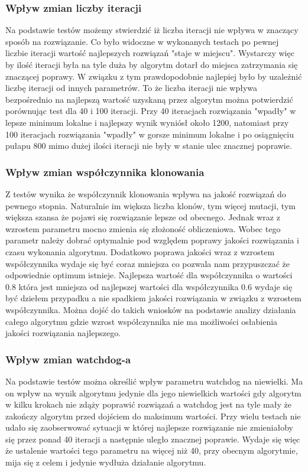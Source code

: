 \documentclass[a4paper]{article}
\begin{document}
\subsubsection{Wpływ zmian liczby iteracji}
Na podstawie testów możemy stwierdzić iż liczba iteracji nie wpływa w znaczący sposób na rozwiązanie. Co było widoczne w wykonanych testach po pewnej liczbie iteracji wartość najlepszych rozwiązań "staje w miejscu". Wystarczy więc by ilość iteracji była na tyle duża by algorytm dotarł do miejsca zatrzymania się znaczącej poprawy. W związku z tym prawdopodobnie najlepiej było by uzależnić liczbę iteracji od innych parametrów. To że liczba iteracji nie wpływa bezpośrednio na najlepszą wartość uzyskaną przez algorytm można potwierdzić porównując test dla 40 i 100 iteracji. Przy 40 iteracjach rozwiązania "wpadły" w lepsze minimum lokalne i najlepszy wynik wyniósł około 1200, natomiast przy 100 iteracjach rozwiązania "wpadły" w gorsze minimum lokalne i po osiągnięciu pułapu 800 mimo dużej ilości iteracji nie były w stanie ulec znacznej poprawie.
\subsubsection{Wpływ zmian współczynnika klonowania}
Z testów wynika że współczynnik klonowania wpływa na jakość rozwiązań do pewnego stopnia. Naturalnie im większa liczba klonów, tym więcej mutacji, tym większa szansa że pojawi się rozwiązanie lepsze od obecnego. Jednak wraz z wzrostem parametru mocno zmienia się złożoność obliczeniowa. Wobec tego parametr należy dobrać optymalnie pod względem poprawy jakości rozwiązania i czasu wykonania algorytmu. Dodatkowo poprawa jakości wraz z wzrostem współczynnika wydaje się być coraz mniejsza co pozwala nam przypuszczać że odpowiednie optimum istnieje. Najlepsza wartość dla współczynnika o wartości 0.8 która jest mniejsza od najlepszej wartości dla współczynnika 0.6 wydaje się być dziełem przypadku a nie spadkiem jakości rozwiązania w związku z wzrostem współczynnika. Można dojść do takich wniosków na podstawie analizy działania całego algorytmu gdzie wzrost współczynnika nie ma możliwości osłabienia jakości rozwiązania najlepszego.
\subsubsection{Wpływ zmian watchdog-a}
Na podstawie testów można określić wpływ parametru watchdog na niewielki. Ma on wpływ na wynik algorytmu jedynie dla jego niewielkich wartości gdy algorytm w kilku krokach nie zdąży poprawić rozwiązań a watchdog jest na tyle mały że zakończy algorytm przed dojściem do maksimum wartości. Przy wielu testach nie udało się zaobserwować sytuacji w której najlepsze rozwiązanie nie zmieniałoby się przez ponad 40 iteracji a następnie uległo znacznej poprawie. Wydaje się więc że ustalenie wartości tego parametru na więcej niż 40, przy obecnym algorytmie, mija się z celem i jedynie wydłuża działanie algorytmu. 
\end{document}
